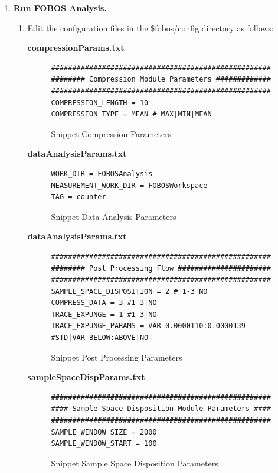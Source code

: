 \begin{enumerate}
\item \textbf{Run FOBOS Analysis.}
  \begin{enumerate}
   \item Edit the configuration files in the \$fobos/config directory as follows:
   
   
   \textbf{compressionParams.txt}
   \begin{figure}[H]
	\begin{Verbatim}[frame=single]
####################################################
######## Compression Module Parameters #############
####################################################
COMPRESSION_LENGTH = 10
COMPRESSION_TYPE = MEAN # MAX|MIN|MEAN
	\end{Verbatim}
	\caption{\label{fig:fobos:paramsa}Snippet Compression Parameters}
	\end{figure}
	
  
   \textbf{dataAnalysisParams.txt}
   \begin{figure}[H]
	\begin{Verbatim}[frame=single]
WORK_DIR = FOBOSAnalysis
MEASUREMENT_WORK_DIR = FOBOSWorkspace
TAG = counter
	\end{Verbatim}
	\caption{\label{fig:fobos:paramanalysis}Snippet Data Analysis Parameters}
	\end{figure}
	
   
   \textbf{dataAnalysisParams.txt}
   \begin{figure}[H]
	\begin{Verbatim}[frame=single]
####################################################
######## Post Processing Flow ######################
####################################################
SAMPLE_SPACE_DISPOSITION = 2 # 1-3|NO
COMPRESS_DATA = 3 #1-3|NO
TRACE_EXPUNGE = 1 #1-3|NO 
TRACE_EXPUNGE_PARAMS = VAR-0.0000110:0.0000139 #STD|VAR-BELOW:ABOVE|NO
	\end{Verbatim}
	\caption{\label{fig:fobos:parampsotproc}Snippet Post Processing Parameters}
	\end{figure}
	
   \textbf{sampleSpaceDispParams.txt}
   \begin{figure}[H]
	\begin{Verbatim}[frame=single]
####################################################
#### Sample Space Disposition Module Parameters ####
####################################################
SAMPLE_WINDOW_SIZE = 2000
SAMPLE_WINDOW_START = 100 
	\end{Verbatim}
	\caption{\label{fig:fobos:paramdisp}Snippet Sample Space Disposition Parameters}
	\end{figure}
	

\end{enumerate}
\end{enumerate}
